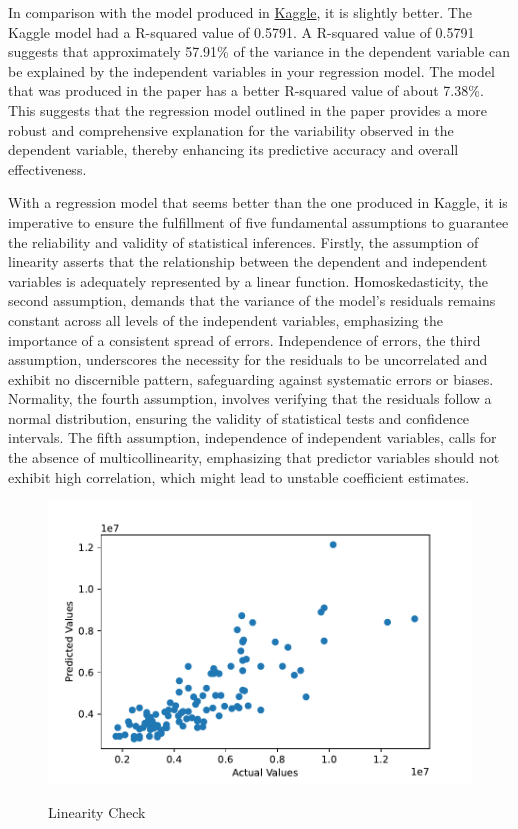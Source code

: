 \documentclass[12pt]{article}
\begin{document}
In comparison with the model produced in \href{https://www.kaggle.com/code/ashydv/housing-price-prediction-linear-regression/notebook}{Kaggle}, it is slightly better. The Kaggle model had a R-squared value of 0.5791. A R-squared value of 0.5791 suggests that approximately 57.91\% of the variance in the dependent variable can be explained by the independent variables in your regression model. The model that was produced in the paper has a better R-squared value of about 7.38\%. This suggests that the regression model outlined in the paper provides a more robust and comprehensive explanation for the variability observed in the dependent variable, thereby enhancing its predictive accuracy and overall effectiveness.

With a regression model that seems better than the one produced in Kaggle, it is imperative to ensure the fulfillment of five fundamental assumptions to guarantee the reliability and validity of statistical inferences. Firstly, the assumption of linearity asserts that the relationship between the dependent and independent variables is adequately represented by a linear function. Homoskedasticity, the second assumption, demands that the variance of the model's residuals remains constant across all levels of the independent variables, emphasizing the importance of a consistent spread of errors. Independence of errors, the third assumption, underscores the necessity for the residuals to be uncorrelated and exhibit no discernible pattern, safeguarding against systematic errors or biases. Normality, the fourth assumption, involves verifying that the residuals follow a normal distribution, ensuring the validity of statistical tests and confidence intervals. The fifth assumption, independence of independent variables, calls for the absence of multicollinearity, emphasizing that predictor variables should not exhibit high correlation, which might lead to unstable coefficient estimates.\cite{CFA}

\begin{figure}[h!]
    \caption{Linearity Check}
    \includegraphics[width=1\textwidth]{linearity_check.pdf}
    \label{fig:linearity_check}
\end{figure}
\end{document}

